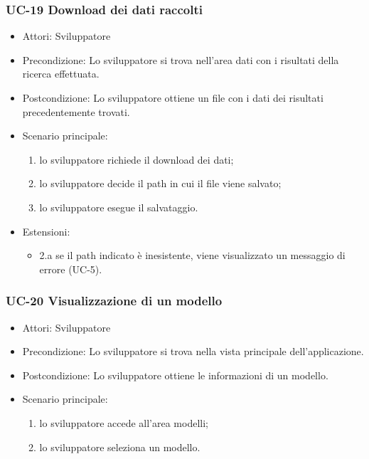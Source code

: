 	\subsubsection{UC-19 Download dei dati raccolti}
		\begin{itemize}
			\item Attori: Sviluppatore
			\item Precondizione: Lo sviluppatore si trova nell'area dati con i risultati della ricerca effettuata.
			\item Postcondizione: Lo sviluppatore ottiene un file con i dati dei risultati precedentemente trovati.
			\item Scenario principale:
				\begin{enumerate}
					\item lo sviluppatore richiede il download dei dati;
					\item lo sviluppatore decide il path in cui il file viene salvato;
					\item lo sviluppatore esegue il salvataggio.
				\end{enumerate}
			\item Estensioni:
				\begin{itemize}
					\item 2.a se il path indicato è inesistente, viene visualizzato un messaggio di errore (UC-5).
				\end{itemize}
		\end{itemize} 

		
	\subsubsection{UC-20 Visualizzazione di un modello}
		\begin{itemize}
			\item Attori: Sviluppatore
			\item Precondizione: Lo sviluppatore si trova nella vista principale dell'applicazione.
			\item Postcondizione: Lo sviluppatore ottiene le informazioni di un modello.
			\item Scenario principale:
			\begin{enumerate}
				\item lo sviluppatore accede all'area modelli;
				\item lo sviluppatore seleziona un modello.
			\end{enumerate}
	\end{itemize}
	

